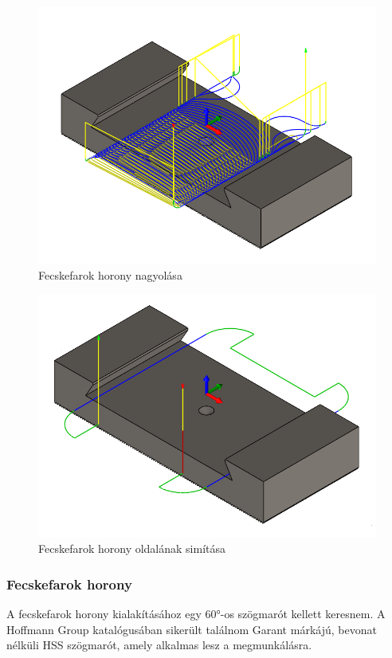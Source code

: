 \documentclass[12pt,a4paper,oneside]{report}
\begin{document}
\begin{figure}[H]
    \centering
    \includegraphics[width=12cm]{figures/kemenypofa_dovetail_1.png}
    \caption{Fecskefarok horony nagyolása}
    \label{Fig:kemenypofa_dovetail_1}
\end{figure}

\begin{figure}[H]
    \centering
    \includegraphics[width=11.5cm]{figures/kemenypofa_dovetail_2.png}
    \caption{Fecskefarok horony oldalának simítása}
    \label{Fig:kemenypofa_dovetail_2}
\end{figure}

\subsubsection{Fecskefarok horony}
A fecskefarok horony kialakításához egy 60°-os szögmarót kellett keresnem. A Hoffmann Group katalógusában sikerült találnom Garant márkájú, bevonat nélküli HSS szögmarót, amely alkalmas lesz a megmunkálásra.
\end{document}
